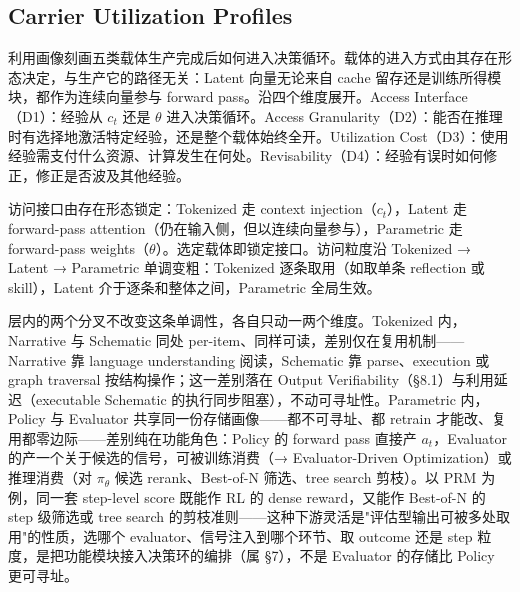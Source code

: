 
\subsection{Carrier Utilization Profiles}
\label{sec:util_profiles}

利用画像刻画五类载体生产完成后如何进入决策循环。载体的进入方式由其存在形态决定，与生产它的路径无关：Latent 向量无论来自 cache 留存还是训练所得模块，都作为连续向量参与 forward pass。沿四个维度展开。Access Interface（D1）：经验从 $c_t$ 还是 $\theta$ 进入决策循环。Access Granularity（D2）：能否在推理时有选择地激活特定经验，还是整个载体始终全开。Utilization Cost（D3）：使用经验需支付什么资源、计算发生在何处。Revisability（D4）：经验有误时如何修正，修正是否波及其他经验。






访问接口由存在形态锁定：Tokenized 走 context injection（$c_t$），Latent 走 forward-pass attention（仍在输入侧，但以连续向量参与），Parametric 走 forward-pass weights（$\theta$）。选定载体即锁定接口。访问粒度沿 Tokenized → Latent → Parametric 单调变粗：Tokenized 逐条取用（如取单条 reflection 或 skill），Latent 介于逐条和整体之间，Parametric 全局生效。

层内的两个分叉不改变这条单调性，各自只动一两个维度。Tokenized 内，Narrative 与 Schematic 同处 per-item、同样可读，差别仅在复用机制——Narrative 靠 language understanding 阅读，Schematic 靠 parse、execution 或 graph traversal 按结构操作；这一差别落在 Output Verifiability（§8.1）与利用延迟（executable Schematic 的执行同步阻塞），不动可寻址性。Parametric 内，Policy 与 Evaluator 共享同一份存储画像——都不可寻址、都 retrain 才能改、复用都零边际——差别纯在功能角色：Policy 的 forward pass 直接产 $a_t$，Evaluator 的产一个关于候选的信号，可被训练消费（→ Evaluator-Driven Optimization）或推理消费（对 $\pi_\theta$ 候选 rerank、Best-of-N 筛选、tree search 剪枝）。以 PRM \cite{Lig23} 为例，同一套 step-level score 既能作 RL 的 dense reward，又能作 Best-of-N 的 step 级筛选或 tree search 的剪枝准则——这种下游灵活是"评估型输出可被多处取用"的性质，选哪个 evaluator、信号注入到哪个环节、取 outcome 还是 step 粒度，是把功能模块接入决策环的编排（属 §7），不是 Evaluator 的存储比 Policy 更可寻址。

